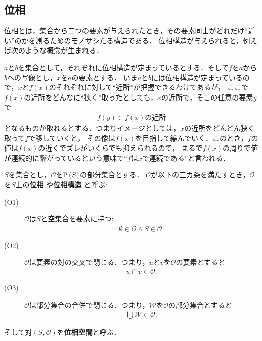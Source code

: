 \subsection{位相}
	位相とは，集合から二つの要素が与えられたとき，その要素同士がどれだけ``近い''のかを測るためのモノサシたる構造である．
	位相構造が与えられると，例えば次のような概念が生まれる．
	
	$a$と$b$を集合として，それぞれに位相構造が定まっているとする．そして$f$を$a$から$b$への写像とし，$x$を$a$の要素とする．
	いま$a$と$b$には位相構造が定まっているので，$x$と$f(x)$のそれぞれに対して``近所''が把握できるわけであるが，
	ここで$f(x)$の近所をどんなに``狭く''取ったとしても，$x$の近所で，そこの任意の要素$y$で
	\begin{align}
		f(y) \in \mbox{$f(x)$の近所}
	\end{align}
	となるものが取れるとする．つまりイメージとしては，$x$の近所をどんどん狭く取って$f$で移していくと，
	その像は$f(x)$を目指して縮んでいく．このとき，$f$の値は$f(x)$の近くでズレがいくらでも抑えられるので，
	まるで$f(x)$の周りで値が連続的に繋がっているという意味で``$f$は$x$で連続である''と言われる．
	
	\begin{screen}
		\begin{dfn}[位相]
			$S$を集合とし，$\mathscr{O}$を$\operatorname*{P} \left(S\right)$の部分集合とする．
			$\mathscr{O}$が以下の三カ条を満たすとき，$\mathscr{O}$を$S$上の{\bf 位相}
			や{\bf 位相構造}
			と呼ぶ:
			\begin{description}
				\item[(O1)] $\mathscr{O}$は$S$と空集合を要素に持つ:
					\begin{align}
						\emptyset \in \mathscr{O} \wedge S \in \mathscr{O}.
					\end{align}
				\item[(O2)] $\mathscr{O}$は要素の対の交叉で閉じる．つまり，$u$と$v$を$\mathscr{O}$の要素とすると
					\begin{align}
						u \cap v \in \mathscr{O}.
					\end{align}
				\item[(O3)] $\mathscr{O}$は部分集合の合併で閉じる．つまり，$\mathscr{W}$を$\mathscr{O}$の部分集合とすると
					\begin{align}
						\bigcup \mathscr{W} \in \mathscr{O}.
					\end{align}
			\end{description}
			そして対$(S,\mathscr{O})$を{\bf 位相空間}と呼ぶ．
		\end{dfn}
	\end{screen}
	
